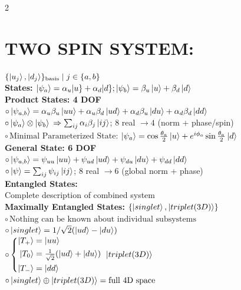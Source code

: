 \documentclass[10pt,a4paper]{article}
\begin{document}
\begin{multicols}{2}
\section{TWO SPIN SYSTEM: }
$\{\ket{u_j}, \ket{d_j} \}_\text{basis} \mid  j \in \{a, b\} $\\
\textbf{States: $\ket{\psi_a}=\alpha_u|u\}+\alpha_d|d\}; \ket{\psi_b}=\beta_u\ket{u}+\beta_d\ket{d} $}\\
\textbf{Product States: 4 DOF} \\
$\circ\ket{\psi_{a,b}} = \alpha_u\beta_u\ket{uu}+ \alpha_u\beta_d\ket{ud} + \alpha_d\beta_u\ket{du} + \alpha_d\beta_d\ket{dd} $\\
$\circ \ket{\psi_a}\otimes\ket{\psi_b}$ 
$\Rightarrow \sum_{ij}\alpha_i\beta_j\ket{ij}$; 
$8$ real $\to 4$ (norm + phase/spin) \\
$\circ\, \text{Minimal Parameterized State:} $ $\ket{\psi_a} = \cos\frac{\theta_a}{2}\ket{u} + e^{i\phi_a}\sin\frac{\theta_a}{2}\ket{d} $\\
\textbf{General State: 6 DOF} \\
$\circ \ket{\psi_{a,b}} = \psi_{uu}\ket{uu}+ \psi_{ud}\ket{ud} + \psi_{du}\ket{du} + \psi_{dd}\ket{dd} $\\
$\circ \ket{\psi}=\sum_{ij}\psi_{ij}\ket{ij}$; $8$ real $\to 6$ (global norm + phase) \\
\textbf{Entangled States: }\\
Complete description of combined system\\
\textbf{Maximally Entangled States:} $\{ \ket{singlet},  \ket{triplet (3D)}\}$\\
$\circ\,\text{Nothing can be known about individual subsystems}$\\
$\circ\ket{singlet} = 1/\sqrt{2}(\ket{ud}-\ket{du})$ \\ 
$\circ\left\{
\begin{aligned}
\ket{T_+}&=\ket{uu}\\
\ket{T_0}&=\tfrac{1}{\sqrt{2}}(\ket{ud}+\ket{du})\\
\ket{T_-}&=\ket{dd}
\end{aligned}
\right.\ \ket{triplet (3D)}$ \\
$\circ\ket{singlet} \oplus \ket{triplet (3D)} = \text{full 4D space}$ \\


\end{multicols}
\end{document}
